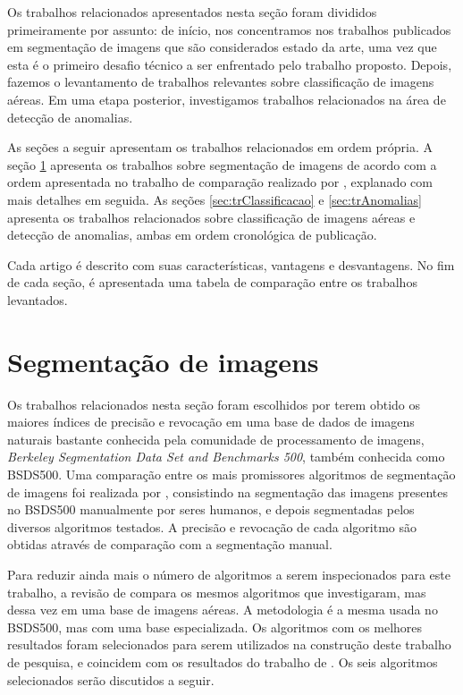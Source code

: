 Os trabalhos relacionados apresentados nesta seção foram divididos primeiramente por assunto: de início, nos concentramos nos trabalhos publicados em segmentação de imagens que são considerados estado da arte, uma vez que esta é o primeiro desafio técnico a ser enfrentado pelo trabalho proposto. Depois, fazemos o levantamento de trabalhos relevantes sobre classificação de imagens aéreas. Em uma etapa posterior, investigamos trabalhos relacionados na área de detecção de anomalias.

As seções a seguir apresentam os trabalhos relacionados em ordem própria.  A seção \ref{sec:trSegmentacao} apresenta os trabalhos sobre segmentação de imagens de acordo com a ordem apresentada no trabalho de comparação realizado por , explanado com mais detalhes em seguida. As seções \ref{sec:trClassificacao} e \ref{sec:trAnomalias} apresenta os trabalhos relacionados sobre classificação de imagens aéreas e detecção de anomalias, ambas em ordem cronológica de publicação.

Cada artigo é descrito com suas características, vantagens e desvantagens. No fim de cada seção, é apresentada uma tabela de comparação entre os trabalhos levantados.

\section{Segmentação de imagens}\label{sec:trSegmentacao}

Os trabalhos relacionados nesta seção foram escolhidos por terem obtido os maiores índices de precisão e revocação em uma base de dados de imagens naturais bastante conhecida pela comunidade de processamento de imagens, \textit{Berkeley Segmentation Data Set and Benchmarks 500}, também conhecida como BSDS500. Uma comparação entre os mais promissores algoritmos de segmentação de imagens foi realizada por , consistindo na segmentação das imagens presentes no BSDS500 manualmente por seres humanos, e depois segmentadas pelos diversos algoritmos testados. A precisão e revocação de cada algoritmo são obtidas através de comparação com a segmentação manual.

Para reduzir ainda mais o número de algoritmos a serem inspecionados para este trabalho, a revisão de  compara os mesmos algoritmos que  investigaram, mas dessa vez em uma base de imagens aéreas. A metodologia é a mesma usada no BSDS500, mas com uma base especializada. Os algoritmos com os melhores resultados foram selecionados para serem utilizados na construção deste trabalho de pesquisa, e coincidem com os resultados do trabalho de . Os seis algoritmos selecionados serão discutidos a seguir.

